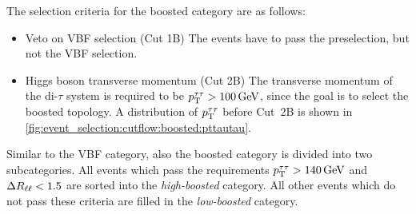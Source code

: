 The selection criteria for the boosted category are as follows:
\begin{itemize}
    \item Veto on VBF selection (Cut 1B)
        The events have to pass the preselection, but not the VBF selection.
    \item Higgs boson transverse momentum (Cut 2B)
        The transverse momentum of the di-$\tau$ system is required to be $\pt^{\tau\tau} > \SI{100}{\GeV}$, since
        the goal is to select the boosted topology.
        A distribution of $p_\text{T}^{\tau\tau}$ before Cut~2B is shown in \cref{fig:event_selection:cutflow:boosted:pttautau}.
\end{itemize}
Similar to the VBF category, also the boosted category is divided into two subcategories.
All events which pass the requirements $\pt^{\tau\tau} > \SI{140}{\GeV}$ and $\Delta R_{\ell\ell} < 1.5$ are sorted
into the \emph{high-boosted} category. All other events which do not pass these criteria are filled in the
\emph{low-boosted} category.

